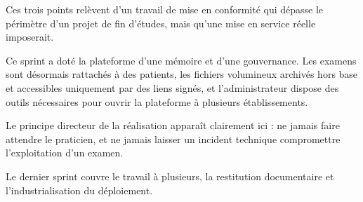 Ces trois points relèvent d'un travail de mise en conformité qui dépasse le périmètre d'un
projet de fin d'études, mais qu'une mise en service réelle imposerait.


Ce sprint a doté la plateforme d'une mémoire et d'une gouvernance. Les examens sont désormais
rattachés à des patients, les fichiers volumineux archivés hors base et accessibles uniquement
par des liens signés, et l'administrateur dispose des outils nécessaires pour ouvrir la
plateforme à plusieurs établissements.

Le principe directeur de la réalisation apparaît clairement ici : ne jamais faire attendre le
praticien, et ne jamais laisser un incident technique compromettre l'exploitation d'un examen.

Le dernier sprint couvre le travail à plusieurs, la restitution documentaire et
l'industrialisation du déploiement.
